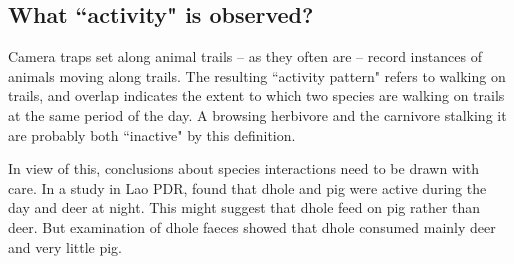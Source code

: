 \documentclass[a4paper]{article}
\begin{document}
\subsection{What ``activity" is observed?}
\label{sec:activity}

Camera traps set along animal trails -- as they often are -- record instances of animals moving along trails. The resulting ``activity pattern" refers to walking on trails, and overlap indicates the extent to which two species are walking on trails at the same period of the day. A browsing herbivore and the carnivore stalking it are probably both ``inactive" by this definition.

In view of this, conclusions about species interactions need to be drawn with care. In a study in Lao PDR, \citet{Kamler+2012} found that dhole and pig were active during the day and deer at night. This might suggest that dhole feed on pig rather than deer. But examination of dhole faeces showed that dhole consumed mainly deer and very little pig.


\renewcommand{\refname}{\section{References}} %



\end{document}
